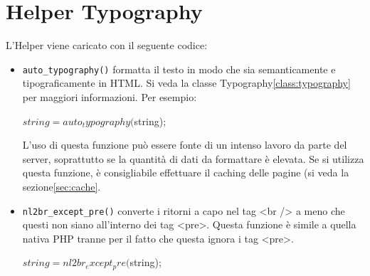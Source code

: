 \section{Helper Typography}
\label{helper:typography}

L'Helper viene caricato con il seguente codice:


\begin{itemize}
\item \verb|auto_typography()| formatta il testo in modo che sia semanticamente e tipograficamente in \ac{HTML}. Si veda la classe Typography\vref{class:typography} per maggiori informazioni. Per esempio:

 \begin{code}
$string = auto_typography($string);
\end{code}

L'uso di questa funzione può essere fonte di un intenso lavoro da parte del server, soprattutto se la quantità di dati da formattare è elevata. Se si utilizza questa funzione, è consigliabile effettuare il caching delle pagine (si veda la sezione\vref{sec:cache}.

\item \verb|nl2br_except_pre()| converte i ritorni a capo nel tag <br /> a meno che questi non siano all'interno dei tag <pre>. Questa funzione è simile a quella nativa PHP  tranne per il fatto che questa ignora i tag <pre>.

 \begin{code}
$string = nl2br_except_pre($string);
\end{code}
\end{itemize}